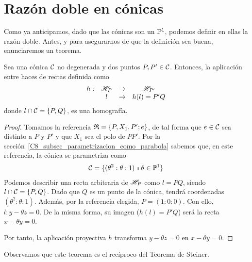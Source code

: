 \section{Razón doble en cónicas}
Como ya anticipamos, dado que las cónicas son un $\mathbb{P}^1$, podemos definir en ellas la razón doble. Antes, y para asegurarnos de que la definición sea buena, enunciaremos un teorema.

\begin{theo}
	Sea una cónica $\mathcal{C}$ no degenerada y dos puntos $P,P'\in\mathcal{C}$. Entonces, la aplicación entre haces de rectas definida como
	\begin{equation}
		\begin{array}{cccc}
		h:& \mathscr{H}_P&\rightarrow &\mathscr{H}_{P'}\\
		& l&\rightarrow & h(l)=P'Q
		\end{array}
	\end{equation}
	donde $l\cap\mathcal{C}=\{P,Q\}$, es una homografía.
\end{theo}
\begin{proof}
	Tomamos la referencia $\mathfrak{R}=\{P,X_1,P';e\}$, de tal forma que $e\in\mathcal{C}$ sea distinto a $P$ y $P'$ y que $X_1$ sea el polo de $PP'$. Por la sección~\ref{C8_subsec_parametrizacion_como_parabola} sabemos que, en este referencia, la cónica se parametriza como
	\begin{equation*}
		\mathcal{C}=\{(\theta^2:\theta:1)\shortparallel\theta\in\mathbb{P}^1\}
	\end{equation*}
	Podemos describir una recta arbitraria de $\mathscr{H}_P$ como $l=PQ$, siendo $l\cap\mathcal{C}=\{P,Q\}$. Dado que $Q$ es un punto de la cónica, tendrá coordenadas $(\theta^2:\theta:1)$. Además, por la referencia elegida, $P=(1:0:0)$. Con ello, $l:y-\theta z=0$. De la misma forma, su imagen ($h(l)=P'Q$) será la recta $x-\theta y=0$.
	
	Por tanto, la aplicación proyectiva $h$ transforma $y-\theta z=0$ en $x-\theta y=0$.
\end{proof}
\begin{obs}
	Observamos que este teorema es el recíproco del Teorema de Steiner.
\end{obs}
